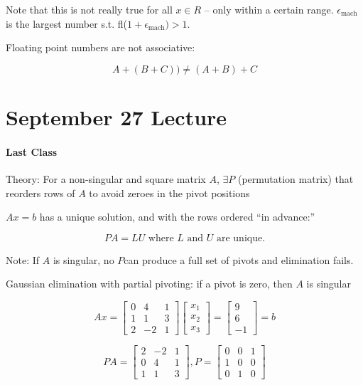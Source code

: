 \documentclass[12pt]{article}
\newcommand{\<}{\langle}
\renewcommand{\>}{\rangle}
\begin{document}
Note that this is not really true for all $x \in R$ -- only within a certain range. $\epsilon_{\text{mach}}$ is the largest number s.t. fl($1 + \epsilon_{\text{mach}}) > 1$.

Floating point numbers are not associative:

\[
	A+(B+C)) \not= (A+B)+C
\]

\section{September 27 Lecture}

\paragraph{Last Class} Theory: For a non-singular and square matrix $A$, $\exists P$ (permutation matrix) that reorders rows of $A$ to avoid zeroes in the pivot positions

$Ax=b$ has a unique solution, and with the rows ordered ``in advance:''

\[
	P A = L U \text{ where } L \text{ and } U \text{ are unique.}
\]

Note: If $A$ is singular, no $P$can produce a full set of pivots and elimination fails.

Gaussian elimination with partial pivoting: if a pivot is zero, then $A$ is singular

\[
	A x = 
	\begin{bmatrix}
		0 & 4 & 1 \\
		1 & 1 & 3 \\
		2 & -2 & 1
	\end{bmatrix}
	\begin{bmatrix}
		x_1 \\ x_2 \\ x_3
	\end{bmatrix} = 
	\begin{bmatrix}
		9 \\ 6 \\ -1
	\end{bmatrix} = 
	b
\]

\[
	PA =
	\begin{bmatrix}
		2 & -2 & 1 \\
		0 & 4 & 1 \\
		1 & 1 & 3
	\end{bmatrix},
	P = 
	\begin{bmatrix}
		0 & 0 & 1 \\
		1 & 0 & 0 \\
		0 & 1 & 0
	\end{bmatrix}
\]
\end{document}
